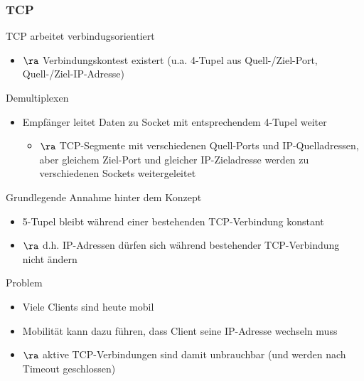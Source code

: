     \subsubsection{TCP}
      TCP arbeitet verbindugsorientiert 
      \begin{itemize}
        \item $\ra$ Verbindungskontest existert (u.a. 4-Tupel aus 
          Quell-/Ziel-Port, Quell-/Ziel-IP-Adresse)
      \end{itemize}
      Demultiplexen
      \begin{itemize}
        \item Empfänger leitet Daten zu Socket mit entsprechendem 4-Tupel weiter
          \begin{itemize}
            \item $\ra$ TCP-Segmente mit verschiedenen Quell-Ports und IP-Quelladressen, aber gleichem
              Ziel-Port und gleicher IP-Zieladresse werden zu verschiedenen Sockets weitergeleitet
          \end{itemize}
      \end{itemize}
      Grundlegende Annahme hinter dem Konzept
      \begin{itemize}
        \item 5-Tupel bleibt während einer bestehenden TCP-Verbindung konstant
        \item $\ra$ d.h. IP-Adressen dürfen sich während bestehender TCP-Verbindung nicht ändern
      \end{itemize}
      Problem
      \begin{itemize}
        \item Viele Clients sind heute mobil
        \item Mobilität kann dazu führen, dass Client seine IP-Adresse wechseln muss
        \item $\ra$ aktive TCP-Verbindungen sind damit unbrauchbar (und werden nach Timeout geschlossen)
      \end{itemize}

